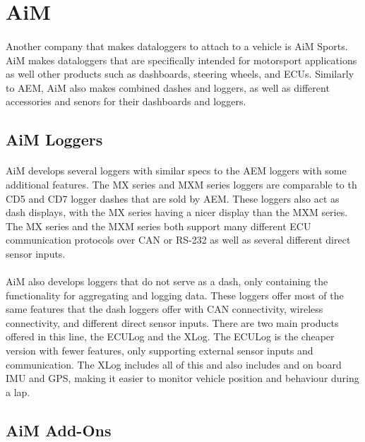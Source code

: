 \section{AiM}

\paragraph{}
Another company that makes dataloggers to attach to a vehicle is AiM Sports.
AiM makes dataloggers that are specifically intended for motorsport applications as well other products such as dashboards, steering wheels, and ECUs.
Similarly to AEM, AiM also makes combined dashes and loggers, as well as different accessories and senors for their dashboards and loggers.

\subsection{AiM Loggers}

\paragraph{}
AiM develops several loggers with similar specs to the AEM loggers with some additional features.
The MX series and MXM series loggers are comparable to th CD5 and CD7 logger dashes that are sold by AEM.
These loggers also act as dash displays, with the MX series having a nicer display than the MXM series.
The MX series and the MXM series both support many different ECU communication protocols over CAN or RS-232 as well as several different direct sensor inputs.


\paragraph{}
AiM also develops loggers that do not serve as a dash, only containing the functionality for aggregating and logging data.
These loggers offer most of the same features that the dash loggers offer with CAN connectivity, wireless connectivity, and different direct sensor inputs.
There are two main products offered in this line, the ECULog and the XLog.
The ECULog is the cheaper version with fewer features, only supporting external sensor inputs and communication.
The XLog includes all of this and also includes and on board IMU and GPS, making it easier to monitor vehicle position and behaviour during a lap.

\subsection{AiM Add-Ons}

